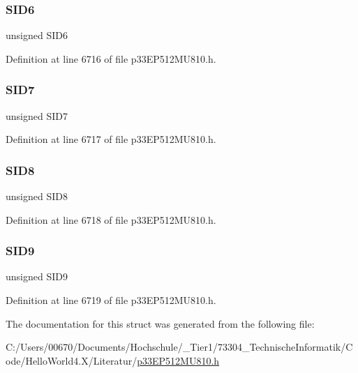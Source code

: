 \subsubsection{\texorpdfstring{S\+I\+D6}{SID6}}
{\footnotesize\ttfamily unsigned S\+I\+D6}



Definition at line 6716 of file p33\+E\+P512\+M\+U810.\+h.

\mbox{\label{structtag_c2_r_x_f9_s_i_d_b_i_t_s_a34097fb76decd431701fa2d86a22328e}} 
\subsubsection{\texorpdfstring{S\+I\+D7}{SID7}}
{\footnotesize\ttfamily unsigned S\+I\+D7}



Definition at line 6717 of file p33\+E\+P512\+M\+U810.\+h.

\mbox{\label{structtag_c2_r_x_f9_s_i_d_b_i_t_s_afe74894633244fdb0b0c01b4e8c522e7}} 
\subsubsection{\texorpdfstring{S\+I\+D8}{SID8}}
{\footnotesize\ttfamily unsigned S\+I\+D8}



Definition at line 6718 of file p33\+E\+P512\+M\+U810.\+h.

\mbox{\label{structtag_c2_r_x_f9_s_i_d_b_i_t_s_a33587704948067005c2a6a3ccc503c99}} 
\subsubsection{\texorpdfstring{S\+I\+D9}{SID9}}
{\footnotesize\ttfamily unsigned S\+I\+D9}



Definition at line 6719 of file p33\+E\+P512\+M\+U810.\+h.



The documentation for this struct was generated from the following file\+:\begin{DoxyCompactItemize}
\item 
C\+:/\+Users/00670/\+Documents/\+Hochschule/\+\_\+\+Tier1/73304\+\_\+\+Technische\+Informatik/\+Code/\+Hello\+World4.\+X/\+Literatur/\hyperlink{p33_e_p512_m_u810_8h}{p33\+E\+P512\+M\+U810.\+h}\end{DoxyCompactItemize}
